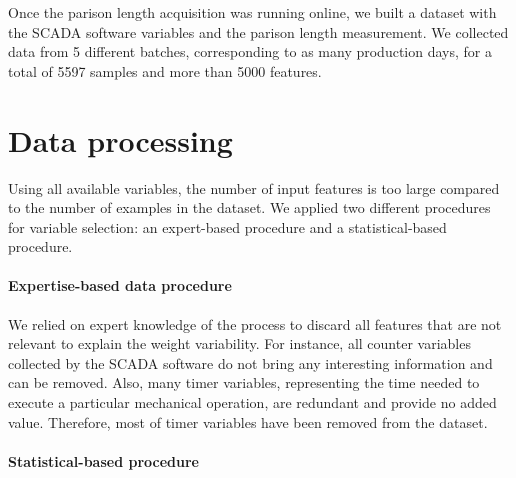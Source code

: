
Once the parison length acquisition was running online, we built a dataset with the SCADA software variables and the parison length measurement. We collected data from 5 different batches, corresponding to as many production days, for a total of 5597 samples and more than 5000 features. 

\section{Data processing}

Using all available variables, the number of input features is too large compared to the number of examples in the dataset. We applied two different procedures for variable selection: an expert-based procedure and a statistical-based procedure.

\paragraph{Expertise-based data procedure}

We relied on expert knowledge of the process to discard all features that are not relevant to explain the weight variability. For instance, all counter variables collected by the SCADA software do not bring any interesting information and can be removed. Also, many timer variables, representing the time needed to execute a particular mechanical operation, are redundant and provide no added value. Therefore, most of timer variables have been removed from the dataset.

\paragraph{Statistical-based procedure}


